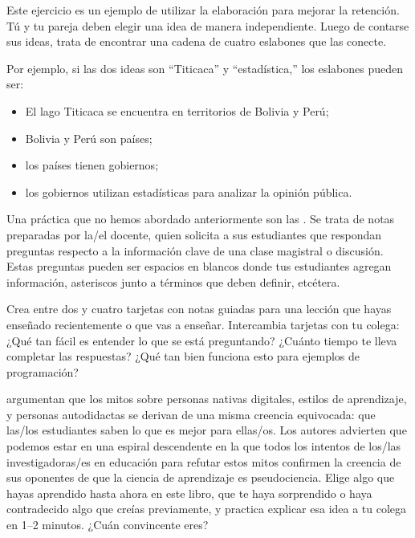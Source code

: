 
Este ejercicio es un ejemplo de utilizar la elaboración para mejorar la retención.
Tú y tu pareja deben elegir una idea de manera independiente.
Luego de contarse sus ideas,
trata de encontrar una cadena de cuatro eslabones
que las conecte.

Por ejemplo,
si las dos ideas son ``Titicaca'' y ``estadística,''
los eslabones pueden ser:

\begin{itemize}

\item
  El lago Titicaca se encuentra en territorios de Bolivia y Perú;

\item
  Bolivia y Perú son países;

\item
 los países tienen gobiernos;

\item
  los gobiernos utilizan estadísticas para analizar la opinión pública.

\end{itemize}


Una práctica que no hemos abordado anteriormente son las .
Se trata de notas preparadas por la/el docente,
quien solicita a sus estudiantes que respondan preguntas respecto a la información clave de una clase magistral o discusión.
Estas preguntas pueden ser espacios en blancos donde tus estudiantes agregan información,
asteriscos junto a términos que deben definir,
etcétera.

Crea entre dos y cuatro tarjetas con notas guiadas para una lección que hayas enseñado recientemente
o que vas a enseñar.
Intercambia tarjetas con tu colega:
¿Qué tan fácil es entender lo que se está preguntando?
¿Cuánto tiempo te lleva completar las respuestas?
¿Qué tan bien funciona esto para ejemplos de programación?


\cite{Kirs2013} argumentan que los mitos sobre personas nativas digitales,
estilos de aprendizaje,
y personas autodidactas se derivan de una misma creencia equivocada: que
las/los estudiantes saben lo que es mejor para ellas/os.
Los autores advierten que podemos estar en una espiral descendente
en la que todos los intentos de los/las investigadoras/es en educación para refutar estos mitos
confirmen la creencia de sus oponentes de que la ciencia de aprendizaje es pseudociencia.
Elige algo que hayas aprendido hasta ahora en este libro,
que te haya sorprendido o haya contradecido algo que creías previamente,
y practica explicar esa idea a tu colega en 1--2 minutos.
¿Cuán convincente eres?

